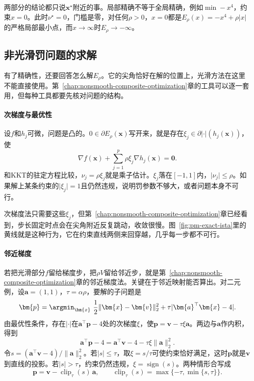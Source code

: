 两部分的结论都只说$\bm{x}^\star$附近的事。局部精确不等于全局精确，例如$\min-x^4$，约束$x=0$。此时$\nu^\star=0$，门槛是零，对任何$\rho>0$，$x=0$都是$E_\rho(x)=-x^4+\rho\lvert x\rvert$的严格局部最小点，而$x\to\infty$时$E_\rho\to-\infty$。

\subsection{非光滑罚问题的求解}
\label{sec:pm-exact-solve}

有了精确性，还要回答怎么解$E_\rho$。它的尖角恰好在解的位置上，光滑方法在这里不能直接使用。第~\ref{chap:nonsmooth-composite-optimization}章的工具可以逐一套用，但每种工具都要先核对问题的结构。

\paragraph{次梯度与最优性}
设$f$和$h_j$可微，问题是凸的。$0\in\partial E_\rho(\bm{x})$写开来，就是存在$\xi_j\in\partial\lvert\cdot\rvert(h_j(\bm{x}))$，使
\begin{equation}
 \nabla f(\bm{x})+\sum_{j=1}^p\rho\xi_j\nabla h_j(\bm{x})=\bm{0}.
 \label{eq:pm-exact-subgradient}
\end{equation}
和KKT的驻定方程比较，$\nu_j=\rho\xi_j$就是乘子估计。$\xi_j$落在$[-1,1]$内，$\lvert\nu_j\rvert\leq\rho$。如果解上某条约束的$\lvert\xi_j\rvert=1$且仍然违规，说明罚参数不够大，或者问题本身不可行。

次梯度法只需要这些$\xi_j$，但第~\ref{chap:nonsmooth-composite-optimization}章已经看到，步长固定时点会在尖角附近反复跳动，收敛很慢。图~\ref{fig:pm-exact-ista}里的黄线就是这种行为，它在约束直线两侧来回穿越，几乎每一步都不可行。

\paragraph{邻近梯度}
若把光滑部分$f$留给梯度步，把$\rho V$留给邻近步，就是第~\ref{chap:nonsmooth-composite-optimization}章的邻近梯度法。关键在于邻近映射能否算出。对二元例，设$\bm{a}=(1,1)$，$\tau=\alpha\rho$，要解的子问题是
\begin{equation}
 \bm{p}=\argmin_{\bm{x}}\ \frac12\lVert\bm{x}-\bm{v}\rVert_2^2+\tau\lvert\bm{a}^\top\bm{x}-4\rvert .
 \label{eq:pm-exact-prox}
\end{equation}
由最优性条件，存在$\lvert\cdot\rvert$在$\bm{a}^\top\bm{p}-4$处的次梯度$\xi$，使$\bm{p}=\bm{v}-\tau\xi\bm{a}$。两边与$\bm{a}$作内积，得到
\[
 \bm{a}^\top\bm{p}-4=\bm{a}^\top\bm{v}-4-\tau\xi\lVert\bm{a}\rVert_2^2 .
\]
令$s=(\bm{a}^\top\bm{v}-4)/\lVert\bm{a}\rVert_2^2$。若$\lvert s\rvert\leq\tau$，取$\xi=s/\tau$可使约束恰好满足，这时$\bm{p}$就是$\bm{v}$到直线的投影。若$\lvert s\rvert>\tau$，约束仍然违规，$\xi=\operatorname{sign}(s)$。两种情形合写成
\begin{equation}
 \bm{p}=\bm{v}-\operatorname{clip}_\tau(s)\,\bm{a},\qquad
 \operatorname{clip}_\tau(s)=\max\{-\tau,\min\{s,\tau\}\}.
 \label{eq:pm-exact-prox-solution}
\end{equation}

